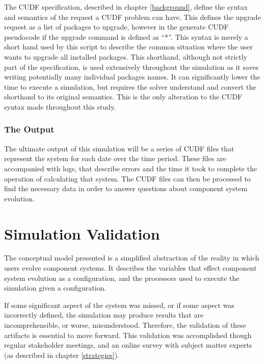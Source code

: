 The CUDF specification, described in chapter \ref{background}, define the syntax and semantics of the request a CUDF problem can have.
This defines the upgrade request as a list of packages to upgrade,
however in the generate CUDF pseudocode if the upgrade command is defined as ``*''.
This syntax is merely a short hand used by this script to describe the common situation where the user wants to upgrade all installed packages.
This shorthand, although not strictly part of the specification, is used extensively throughout the simulation as it saves writing potentially many individual packages names.
It can significantly lower the time to execute a simulation, but requires the solver understand and convert the shorthand to its original semantics.
This is the only alteration to the CUDF syntax made throughout this study.

\subsubsection{The Output}
The ultimate output of this simulation will be a series of CUDF files that represent the system for each date over the time period.
These files are accompanied with logs, that describe errors and the time it took to complete the operation of calculating that system.
The CUDF files can then be processed to find the necessary data in order to answer questions about component system evolution.

\section{Simulation Validation}
The conceptual model presented is a simplified abstraction of the reality in which users evolve component systems.
It describes the variables that effect component system evolution as a configuration,
and the processors used to execute the simulation given a configuration.

If some significant aspect of the system was missed, or if some aspect was incorrectly defined, the simulation may produce results that are incomprehensible,
or worse, misunderstood.
Therefore, the validation of these artifacts is essential to move forward. 
This validation was accomplished though regular stakeholder meetings, and an online survey with subject matter experts (as described in chapter \ref{strategies}).

